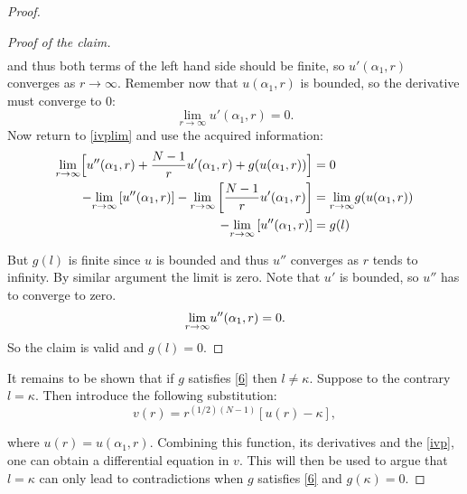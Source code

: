\begin{proof}
\begin{proof}[Proof of the claim]
\begin{align*}
\end{align*}
and thus both terms of the left hand side should be finite, so $u'(\alpha_1,r)$ converges as $r\to\infty.$ Remember now that $u(\alpha_1,r)$ is bounded, so the derivative must converge to 0: $$\underset{r\to\infty}{\lim}u'(\alpha_1,r)=0.$$ Now return to \eqref{ivplim} and use the acquired information:
\begin{align*}
	\underset{r\to\infty}{\lim}\Big[u''(\alpha_1,r)+\frac{N-1}{r}u'(\alpha_1,r)+g(u(\alpha_1,r))\Big]&=0\\
	-\underset{r\to\infty}{\lim}\left[u''(\alpha_1,r)\right]
    -\underset{r\to\infty}{\lim}\left[\frac{N-1}{r}u'(\alpha_1,r)\right]&=\underset{r\to\infty}{\lim} g(u(\alpha_1,r))\\
	-\underset{r\to\infty}{\lim}\left[u''(\alpha_1,r)\right]&=g(l)
\end{align*}

But $g(l)$ is finite since $u$ is bounded and thus $u''$ converges as $r$ tends to infinity. By similar argument the limit is zero. Note that $u'$ is bounded, so $u''$ has to converge to zero. $$\underset{r\to\infty}{\lim} u''(\alpha_1,r)=0.$$ So the claim is valid and $g(l)=0$.\end{proof}

It remains to be shown that if $g$ satisfies \eqref{6} then $l\neq\kappa.$ Suppose to the contrary $l=\kappa$. Then introduce the following substitution:
$$v(r)=r^{(1/2)(N-1)}\left[u(r)-\kappa\right],$$

where $u(r)=u(\alpha_1,r)$. Combining this function, its derivatives and the \eqref{ivp}, one can obtain a differential equation in $v$. This will then be used to argue that $l=\kappa$ can only lead to contradictions when $g$ satisfies \eqref{6} and $g(\kappa)=0$.


\end{proof}
